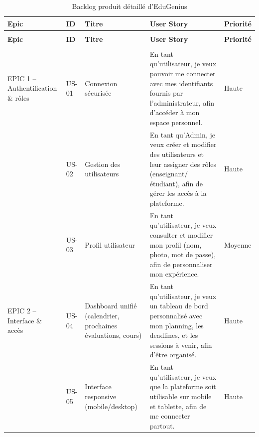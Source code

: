 \renewcommand{\arraystretch}{1.5}
\begin{longtable}{|
    >{\raggedright\arraybackslash}p{3cm} |
    >{\centering\arraybackslash}p{1cm} |
    >{\raggedright\arraybackslash}p{2.5cm} |
    >{\raggedright\arraybackslash}p{6cm} |
    >{\centering\arraybackslash}p{1.8cm} |
}
\caption{Backlog produit détaillé d'EduGenius} \label{tab:backlog} \\
\hline
\textbf{Epic} & \textbf{ID} & \textbf{Titre} & \textbf{User Story} & \textbf{Priorité} \\
\hline
\endfirsthead
 
\multicolumn{5}{c}{{\bfseries Suite du backlog}} \\
\hline
\textbf{Epic} & \textbf{ID} & \textbf{Titre} & \textbf{User Story} & \textbf{Priorité} \\
\hline
\endhead
 
\hline
\multicolumn{5}{|r|}{\textit{Suite sur page suivante}} \\
\endfoot
 
\hline
\endlastfoot
 
EPIC 1 – Authentification \& rôles
 & US-01 & Connexion sécurisée
 & En tant qu'utilisateur, je veux pouvoir me connecter avec mes identifiants fournis par l'administrateur, afin d'accéder à mon espace personnel.
 & Haute \\ \cline{2-5}
 & US-02 & Gestion des utilisateurs
 & En tant qu'Admin, je veux créer et modifier des utilisateurs et leur assigner des rôles (enseignant/étudiant), afin de gérer les accès à la plateforme.
 & Haute \\ \cline{2-5}
 & US-03 & Profil utilisateur
 & En tant qu'utilisateur, je veux consulter et modifier mon profil (nom, photo, mot de passe), afin de personnaliser mon expérience.
 & Moyenne \\ \hline
 
EPIC 2 – Interface \& accès
 & US-04 & Dashboard unifié (calendrier, prochaines évaluations, cours)
 & En tant qu'utilisateur, je veux un tableau de bord personnalisé avec mon planning, les deadlines, et les sessions à venir, afin d'être organisé.
 & Haute \\ \cline{2-5}
 & US-05 & Interface responsive (mobile/desktop)
 & En tant qu'utilisateur, je veux que la plateforme soit utilisable sur mobile et tablette, afin de me connecter partout.
 & Haute \\ \hline
 

\end{longtable}
